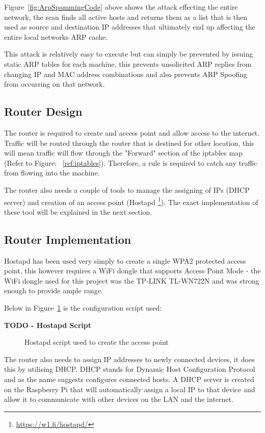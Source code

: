 Figure~\ref{fig:ArpSpammingCode} above shows the attack effecting the entire network, the scan finds all active hosts and returns them as a list that is then used as source and destination IP addresses that ultimately end up affecting the entire local networks ARP cache.

This attack is relatively easy to execute but can simply be prevented by issuing static ARP tables for each machine, this prevents unsolicited ARP replies from changing IP and MAC address combinations and also prevents ARP Spoofing from occurring on that network.


\subsection{Router Design}
The router is required to create and access point and allow access to the internet. Traffic will be routed through the router that is destined for other location, this will mean traffic will flow through the "Forward" section of the iptables map (Refer to Figure: ~\ref{ref:iptables}). Therefore, a rule is required to catch any traffic from flowing into the machine. 

The router also needs a couple of tools to manage the assigning of IPs (DHCP server) and creation of an access point (Hostapd \footnote{\url{https://w1.fi/hostapd/}}). The exact implementation of these tool will be explained in the next section.


\subsection{Router Implementation}
Hostapd has been used very simply to create a single WPA2 protected access point, this however requires a WiFi dongle that supports Access Point Mode - the WiFi dongle used for this project was the TP-LINK TL-WN722N and was strong enough to provide ample range.

Below in Figure~\ref{ref:Hostapd} is the configuration script used:

\begin{center}
	{\bf TODO - Hostapd Script}
	\begin{figure}[h]
		\caption{Hostapd script used to create the access point}
		\label{ref:Hostapd}
	\end{figure}
\end{center}


The router also needs to assign IP addresses to newly connected devices, it does this by utilising DHCP. DHCP stands for Dynamic Host Configuration Protocol and as the name suggests configures connected hosts. A DHCP server is created on the Raspberry Pi that will automatically assign a local IP to that device and allow it to communicate with other devices on the LAN and the internet.

